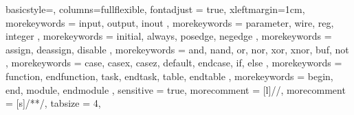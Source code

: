 {
	basicstyle={\small},
	columns=fullflexible,
	fontadjust = true,
	xleftmargin=1cm,
	morekeywords = { input, output, inout },
	morekeywords = { parameter, wire, reg, integer },
	morekeywords = { initial, always, posedge, negedge },
	morekeywords = { assign, deassign, disable },
	morekeywords = { and, nand, or, nor, xor, xnor, buf, not },
	morekeywords = { case, casex, casez, default, endcase, if, else },
	morekeywords = { function, endfunction, task, endtask, table, endtable },
	morekeywords = { begin, end, module, endmodule },
	sensitive = true,
	morecomment = [l]{//},
	morecomment = [s]{/*}{*/},
	tabsize = 4,
}